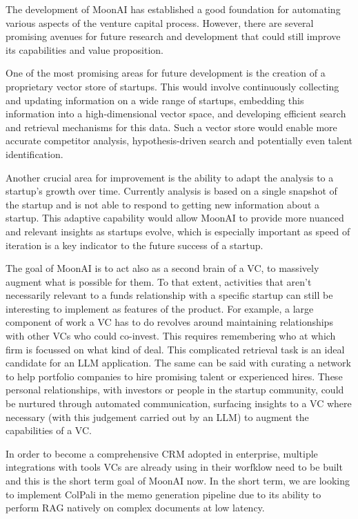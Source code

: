 \documentclass[a4paper, oneside]{discothesis}
\begin{document}
The development of MoonAI has established a good foundation for automating various aspects of the venture capital process. However, there are several promising avenues for future research and development that could still improve its capabilities and value proposition.

One of the most promising areas for future development is the creation of a proprietary vector store of startups. This would involve continuously collecting and updating information on a wide range of startups, embedding this information into a high-dimensional vector space, and developing efficient search and retrieval mechanisms for this data. Such a vector store would enable more accurate competitor analysis, hypothesis-driven search and potentially even talent identification.

Another crucial area for improvement is the ability to adapt the analysis to a startup's growth over time. Currently analysis is based on a single snapshot of the startup and is not able to respond to getting new information about a startup. This adaptive capability would allow MoonAI to provide more nuanced and relevant insights as startups evolve, which is especially important as speed of iteration is a key indicator to the future success of a startup. 

The goal of MoonAI is to act also as a second brain of a VC, to massively augment what is possible for them. To that extent, activities that aren't necessarily relevant to a funds relationship with a specific startup can still be interesting to implement as features of the product. For example, a large component of work a VC has to do revolves around maintaining relationships with other VCs who could co-invest. This requires remembering who at which firm is focussed on what kind of deal. This complicated retrieval task is an ideal candidate for an LLM application. The same can be said with curating a network to help portfolio companies to hire promising talent or experienced hires. These personal relationships, with investors or people in the startup community, could be nurtured through automated communication, surfacing insights to a VC where necessary (with this judgement carried out by an LLM) to augment the capabilities of a VC. 

In order to become a comprehensive CRM adopted in enterprise, multiple integrations with tools VCs are already using in their worfklow need to be built and this is the short term goal of MoonAI now. In the short term, we are looking to implement ColPali in the memo generation pipeline due to its ability to perform RAG natively on complex documents at low latency. 
\end{document}

